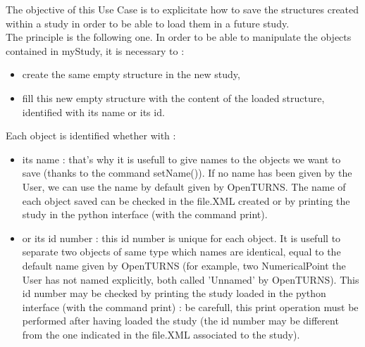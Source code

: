 \renewcommand{\filename}{docUC_LoadSave_Load.tex}
\renewcommand{\filetitle}{UC : How to load a study ?}

\HeaderIILevel



The objective of this Use Case is to explicitate how to save the structures created within a study in order to be able to load them in a future study.\\


The principle is the following one. In order to be able to manipulate the objects contained in myStudy, it is necessary to :
\begin{itemize}
\item create the same empty structure in the new study,
\item fill this new empty structure with the content of the loaded structure, identified with its name or its id.
\end{itemize}

Each object is identified whether with :
\begin{itemize}
\item its name : that's why it is usefull to give names to the objects we want to save (thanks to the command setName()). If no name has been given by the User, we can use the name by default given by OpenTURNS. The name of each object saved can be checked in the file.XML created or by printing the study in the python interface (with the command print).
\item or its id number : this id number is unique for each object. It is usefull to separate two objects of same type which names are identical, equal to the default name given by OpenTURNS (for example, two NumericalPoint the User has not named explicitly, both called 'Unnamed' by OpenTURNS). This id number may be checked by printing the study loaded in the python interface (with the command print) : be carefull, this print operation must be performed after having loaded the study (the id number may be different from the one indicated in the file.XML associated to the study).
\end{itemize}

